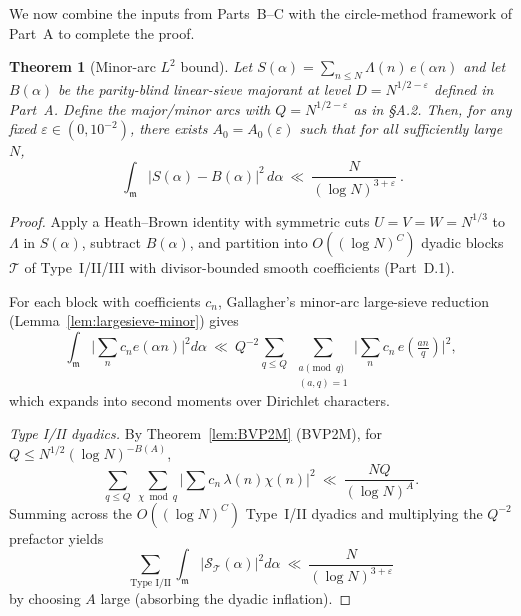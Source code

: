 \documentclass[11pt]{article}
\newtheorem{theorem}[lemma]{Theorem}
\theoremstyle{definition}
\theoremstyle{remark}
\numberwithin{equation}{part}
\begin{document}
We now combine the inputs from Parts~B--C with the circle-method framework of Part~A to complete the proof.

\begin{theorem}[Minor-arc $L^2$ bound]\label{thm:minorA1_proved}
	Let $S(\alpha)=\sum_{n\le N}\Lambda(n)\,e(\alpha n)$ and let $B(\alpha)$ be the parity-blind linear-sieve majorant at level $D=N^{1/2-\varepsilon}$ defined in Part~A.
	Define the major/minor arcs with $Q=N^{1/2-\varepsilon}$ as in \S A.2.
	Then, for any fixed $\varepsilon\in (0,10^{-2})$, there exists $A_0=A_0(\varepsilon)$ such that for all sufficiently large $N$,
	\[
		\boxed{\ \ \int_{\mathfrak m}\!\bigl|S(\alpha)-B(\alpha)\bigr|^{2}\,d\alpha
			\ \ll\ \frac{N}{(\log N)^{3+\varepsilon}}\ .\ }
	\]
\end{theorem}

\begin{proof}
	Apply a Heath–Brown identity with symmetric cuts $U=V=W=N^{1/3}$ to $\Lambda$ in $S(\alpha)$, subtract $B(\alpha)$, and partition into $O((\log N)^C)$ dyadic blocks $\mathcal T$ of Type~I/II/III with divisor-bounded smooth coefficients (Part~D.1).

	For each block with coefficients $c_n$, Gallagher's minor-arc large-sieve reduction (Lemma~\ref{lem:largesieve-minor}) gives
	\[
		\int_{\mathfrak m}\Big|\sum_n c_n e(\alpha n)\Big|^2 d\alpha
		\ \ll\ Q^{-2}\!
		\sum_{q\le Q}\ \sum_{\substack{a\!\!\!\pmod q\\ (a,q)=1}}
		\Big|\sum_n c_n\,e\!\left(\tfrac{an}{q}\right)\Big|^2,
	\]
	which expands into second moments over Dirichlet characters.

	\emph{Type I/II dyadics.} By Theorem~\ref{lem:BVP2M} (BVP2M), for $Q\le N^{1/2}(\log N)^{-B(A)}$,
	\[
		\sum_{q\le Q}\ \sum_{\chi\bmod q}\Big|\sum c_n\,\lambda(n)\chi(n)\Big|^2
		\ \ll\ \frac{NQ}{(\log N)^A}.
	\]
	Summing across the $O((\log N)^C)$ Type~I/II dyadics and multiplying the $Q^{-2}$ prefactor yields
	\[
		\sum_{\text{Type I/II}}\int_{\mathfrak m}|\mathcal S_{\mathcal T}(\alpha)|^2 d\alpha
		\ \ll\ \frac{N}{(\log N)^{3+\varepsilon}}
	\]
	by choosing $A$ large (absorbing the dyadic inflation).


\end{proof}
\end{document}
